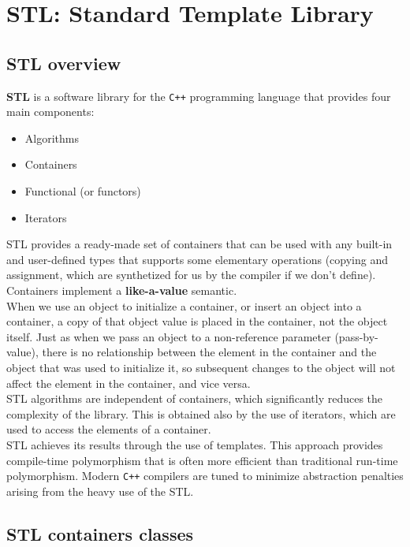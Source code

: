 \chapter{STL: Standard Template Library}

\section{STL overview}

\textbf{STL} is a software library for the \texttt{C++} programming language that
provides four main components:
\begin{itemize}
    \item Algorithms
    \item Containers
    \item Functional (or functors)
    \item Iterators
\end{itemize}

STL provides a ready-made set of containers that can be used with any built-in and
user-defined types that supports some elementary operations (copying and assignment,
which are synthetized for us by the compiler if we don't define). Containers implement
a \textbf{like-a-value} semantic.\\

When we use an object to initialize a container, or insert an object into a container,
a copy of that object value is placed in the container, not the object itself. Just
as when we pass an object to a non-reference parameter (pass-by-value), there is no
relationship between the element in the container and the object that was used to
initialize it, so subsequent changes to the object will not affect the element in the
container, and vice versa.\\

STL algorithms are independent of containers, which significantly reduces the complexity
of the library. This is obtained also by the use of iterators, which are used to access
the elements of a container.\\

STL achieves its results through the use of templates. This approach provides compile-time
polymorphism that is often more efficient than traditional run-time polymorphism. Modern
\texttt{C++} compilers are tuned to minimize abstraction penalties arising from the heavy
use of the STL.\\

\section{STL containers classes}

